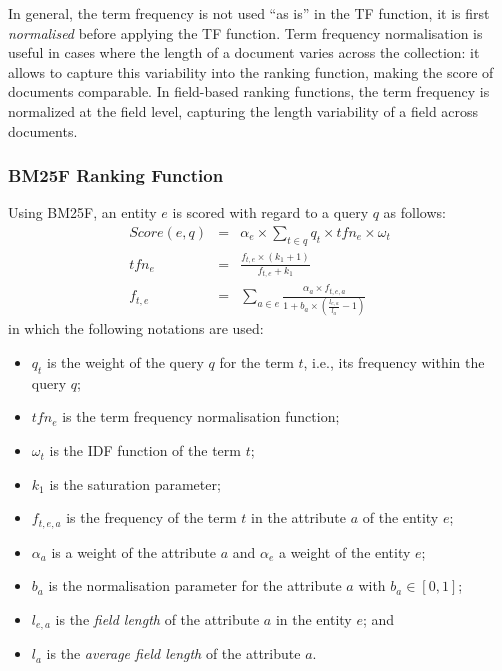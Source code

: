 In general, the term frequency is not used ``as is'' in the TF function, it is first \emph{normalised} before applying the TF function. Term frequency normalisation is useful in cases where the length of a document varies across the collection: it allows to capture this variability into the ranking function, making the score of documents comparable. In \gls{field}-based ranking functions, the term frequency is normalized at the field level, capturing the length variability of a field across documents.

\subsubsection{BM25F Ranking Function}

Using BM25F, an entity $e$ is scored with regard to a query $q$ as follows:
\begin{eqnarray}
Score(e,q) & = & \alpha_e\times\sum_{t\in q}{q_t\times tfn_e \times \omega_t}\\
\label{eq:tfidf-score}
tfn_e & = & \frac{f_{t,e}\times(k_1+1)}{f_{t,e}+k_1} \\
\label{eq:bm25f_2}
f_{t,e} & = &
\sum_{a\in e}{\frac{\alpha_a\times f_{t,e,a}}{1+b_a\times\left(\frac{l_{e,a}}{l_a}-1\right)}}
\label{eq:bm25f_1}
\end{eqnarray}
in which the following notations are used:
\begin{itemize}
	\item $q_t$ is the weight of the query $q$ for the term $t$, i.e., its frequency within the query $q$;
	\item $tfn_e$ is the term frequency normalisation function;
	\item $\omega_t$ is the IDF function of the term $t$;
	\item $k_1$ is the saturation parameter;
	\item $f_{t,e,a}$ is the frequency of the term $t$ in the attribute $a$ of the entity $e$;
	\item $\alpha_a$ is a weight of the attribute $a$ and $\alpha_e$ a weight of the entity $e$;
	\item $b_a$ is the normalisation parameter for the attribute $a$ with $b_a \in \left[0,1\right]$;
	\item $l_{e,a}$ is the \emph{field length} of the attribute $a$ in the entity $e$; and
	\item $l_a$ is the \emph{average field length} of the attribute $a$.
\end{itemize}

